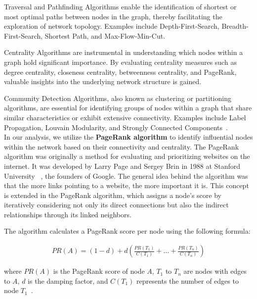 Traversal and Pathfinding Algorithms enable the identification of shortest or
most optimal paths between nodes in the graph, thereby facilitating the exploration of network topology.
Examples include Depth-First-Search, Breadth-First-Search, Shortest Path, and Max-Flow-Min-Cut\cite{neo4j_graph_algorithms}.

Centrality Algorithms are instrumental in understanding which nodes within a graph hold significant importance.
By evaluating centrality measures such as degree centrality, closeness centrality, betweenness centrality,
and PageRank, valuable insights into the underlying network structure is gained\cite{neo4j_graph_algorithms}.

Community Detection Algorithms, also known as clustering or partitioning algorithms,
are essential for identifying groups of nodes within a graph that share similar characteristics
or exhibit extensive connectivity.
Examples include Label Propagation, Louvain Modularity, and Strongly Connected Components~\cite{neo4j_graph_algorithms}.
\\


In our analysis, we utilize the \textbf{PageRank algorithm} to identify influential nodes within the network
based on their connectivity and centrality.
The PageRank algorithm was originally a method for evaluating and prioritizing websites on the internet.
It was developed by Larry Page and Sergey Brin in 1988 at Stanford University ~\cite{page1999pagerank},
the founders of Google.
The general idea behind the algorithm was that the more links pointing to a website, the more important it is.
This concept is extended in the PageRank algorithm, which assigns a node's score by iteratively considering not only its direct connections
but also the indirect relationships through its linked neighbors.

The algorithm calculates a PageRank score per node using the following formula:

\begin{align*}
PR(A)=(1-d)+d(\frac{PR(T_1)}{C(T_1)}+\dots+\frac{PR(T_n)}{C(T_n)})
\end{align*}

where $PR(A)$ is the PageRank score of node $A$,
$T_1$ to $T_n$ are nodes with edges to $A$,
$d$ is the damping factor,
and $C(T_1)$ represents the number of edges to node $T_1$~\cite{neo4j_graph_algorithms}.



